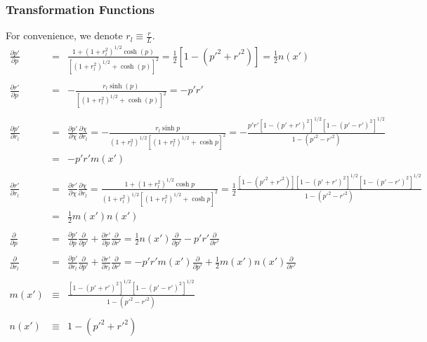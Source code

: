 \documentclass[10pt,letterpaper]{article}
\numberwithin{equation}{section}
\begin{document}
\subsubsection{Transformation Functions}
For convenience, we denote $r_l \equiv \frac{r}{L}$.
\begin{eqnarray}
\frac{\partial p'}{\partial p} &=& \frac{1+(1+r_l^2)^{1/2}\cosh(p)}{\left[(1+r_l^2)^{1/2}+\cosh (p)\right]^2} = \frac12 \left[1-(p'^2+r'^2)\right] = \frac{1}{2}n(x')
\\ \nonumber\\
\frac{\partial r'}{\partial p} &=& -\frac{r_l \sinh (p) }{\left[(1+r_l^2)^{1/2}+\cosh (p)\right]^2}= -p'r'
\\ \nonumber\\
\frac{\partial p'}{\partial r_l} &=&\frac{\partial p'}{\partial \chi}\frac{\partial \chi}{\partial r_l}
= - \frac{r_l\sinh p}{(1+r_l^2)^{1/2}\left[(1+r_l^2)^{1/2}+\cosh p\right]^2}
= -\frac{p'r'\left[ 1-(p'+r')^2\right]^{1/2}\left[1-(p'-r')^2\right]^{1/2}}{1-(p'^2-r'^2)}
\nonumber\\
&=& -p'r'm(x')
\\ \nonumber\\
\frac{\partial r'}{\partial r_l} &=&\frac{\partial r'}{\partial \chi}\frac{\partial \chi}{\partial r_l} = 
\frac{1+(1+r_l^2)^{1/2}\cosh p}{(1+r_l^2)^{1/2}\left[(1+r_l^2)^{1/2}+\cosh p\right]^2}
= \frac{1}{2}\frac{[1-(p'^2+r'^2)]\left[ 1-(p'+r')^2\right]^{1/2}\left[1-(p'-r')^2\right]^{1/2}}{1-(p'^2-r'^2)}
\nonumber\\
&=&\frac{1}{2}m(x')n(x')
\\ \nonumber\\
\frac{\partial}{\partial p} &=& \frac{\partial p'}{\partial p}\frac{\partial}{\partial p'} + \frac{\partial r'}{\partial p}\frac{\partial}{\partial r'}
= \frac{1}{2}n(x')\frac{\partial}{\partial p'} - p'r' \frac{\partial}{\partial r'}
\\ \nonumber\\
\frac{\partial}{\partial r_l} &=& \frac{\partial p'}{\partial r_l}\frac{\partial}{\partial p'} + \frac{\partial r'}{\partial r_l}\frac{\partial}{\partial r'}
= -p'r'm(x')\frac{\partial}{\partial p'} + \frac{1}{2}m(x')n(x') \frac{\partial}{\partial r'}
\\ \nonumber\\
m(x')&\equiv& \frac{\left[ 1-(p'+r')^2\right]^{1/2}\left[1-(p'-r')^2\right]^{1/2}}{1-(p'^2-r'^2)}
\\ \nonumber\\
n(x')&\equiv& 1-(p'^2+r'^2)
\end{eqnarray}
%
\end{document}
